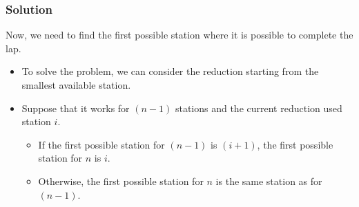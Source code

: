\documentclass{beamer}
\begin{document}
\begin{frame}%
\frametitle{Solution}



Now, we need to find the first possible station where it is possible to complete the lap.
\vspace{0.2cm}
\begin{itemize}
\item<1-> To solve the problem, we can consider the reduction starting from the smallest available station.
\vspace{0.2cm}
\item<2-> Suppose that it works for $(n-1)$ stations and the current reduction used station $i$.
\vspace{0.1cm}
\begin{itemize}
\item<2-> If the first possible station for $(n-1)$ is $(i+1)$, the first possible station for $n$ is $i$.
\vspace{0.1cm}
\item<3-> Otherwise, the first possible station for $n$ is the same station as for $(n-1)$.
\end{itemize}
\end{itemize}

\end{frame}
\end{document}
